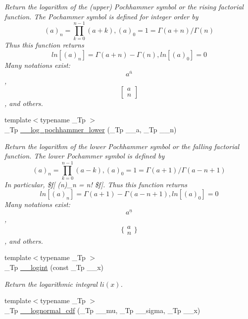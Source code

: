\begin{DoxyCompactItemize}
\begin{DoxyCompactList}\small\item\em Return the logarithm of the (upper) Pochhammer symbol or the rising factorial function. The Pochammer symbol is defined for integer order by \[ (a)_n = \prod_{k=0}^{n-1} (a + k), (a)_0 = 1 = \Gamma(a + n) / \Gamma(n) \] Thus this function returns \[ ln[(a)_n] = \Gamma(a + n) - \Gamma(n), ln[(a)_0] = 0 \] Many notations exist\+: \[ a^{\overline{n}} \], \[ \left[ \begin{array}{c} a \\ n \end{array} \right] \], and others. \end{DoxyCompactList}\item 
{\footnotesize template$<$typename \+\_\+\+Tp $>$ }\\\+\_\+\+Tp \hyperlink{namespacestd_1_1____detail_ab3932d3e5a5be73ea2022d80b065df4a}{\+\_\+\+\_\+log\+\_\+pochhammer\+\_\+lower} (\+\_\+\+Tp \+\_\+\+\_\+a, \+\_\+\+Tp \+\_\+\+\_\+n)
\begin{DoxyCompactList}\small\item\em Return the logarithm of the lower Pochhammer symbol or the falling factorial function. The lower Pochammer symbol is defined by \[ (a)_n = \prod_{k=0}^{n-1} (a - k), (a)_0 = 1 = \Gamma(a + 1) / \Gamma(a - n + 1) \] In particular, \$f\mbox{[} (n)\+\_\+n = n! \$f\mbox{]}. Thus this function returns \[ ln[(a)_n] = \Gamma(a + 1) - \Gamma(a - n + 1), ln[(a)_0] = 0 \] Many notations exist\+: \[ a^{\underline{n}} \], \[ \{ \begin{array}{c} a \\ n \end{array} \} \], and others. \end{DoxyCompactList}\item 
{\footnotesize template$<$typename \+\_\+\+Tp $>$ }\\\+\_\+\+Tp \hyperlink{namespacestd_1_1____detail_a4d5f8cb2b4e6e192faba9418ec14149f}{\+\_\+\+\_\+logint} (const \+\_\+\+Tp \+\_\+\+\_\+x)
\begin{DoxyCompactList}\small\item\em Return the logarithmic integral $ li(x) $. \end{DoxyCompactList}\item 
{\footnotesize template$<$typename \+\_\+\+Tp $>$ }\\\+\_\+\+Tp \hyperlink{namespacestd_1_1____detail_a871cf2e541cc4f8a79e4d219c628edc4}{\+\_\+\+\_\+lognormal\+\_\+cdf} (\+\_\+\+Tp \+\_\+\+\_\+mu, \+\_\+\+Tp \+\_\+\+\_\+sigma, \+\_\+\+Tp \+\_\+\+\_\+x)

\end{DoxyCompactItemize}
